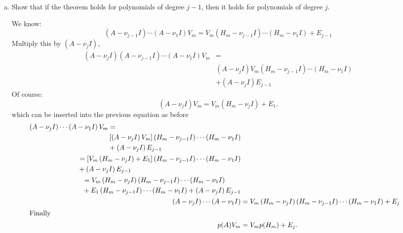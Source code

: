 \documentclass[10pt,letterpaper]{article}
\begin{document}
\begin{enumerate}[(a)]
    \item Show that if the theorem holds for polynomials of degree $j-1$, then it holds for polynomials of degree $j$.

        We know:
        \begin{equation}
            \left(A-\nu_{j-1}I\right)\cdots\left(A-\nu_1I\right)V_m = V_m\left(H_m-\nu_{j-1}I\right)\cdots\left(H_m-\nu_1I\right) + E_{j-1}
        \end{equation}
        Multiply this by $\left(A-\nu_jI\right)$,
        \begin{equation}\begin{split}
            \left(A-\nu_jI\right)\left(A-\nu_{j-1}I\right)\cdots\left(A-\nu_1I\right)V_m &= \\
            & \left(A-\nu_jI\right)V_m\left(H_m-\nu_{j-1}I\right)\cdots\left(H_m-\nu_1I\right) \\
            &+ \left(A-\nu_jI\right)E_{j-1}
        \end{split}\end{equation}
        Of course:
        \begin{equation}
            \left(A-\nu_jI\right)V_m = V_m\left(H_m-\nu_jI\right) + E_1.
        \end{equation}
        which can be inserted into the previous equation  as before
        \begin{subequations}\begin{align}
            \begin{split}
                \left(A-\nu_jI\right)\cdots\left(A-\nu_1I\right)V_m &= \\
                &\left[ \left(A-\nu_jI\right)V_m \right]\left(H_m-\nu_{j-1}I\right)\cdots\left(H_m-\nu_1I\right) \\
                &+ \left(A-\nu_jI\right)E_{j-1}
            \end{split} \\
            \begin{split}
                &= \left[ V_m\left(H_m-\nu_jI\right) + E_1 \right]\left(H_m-\nu_{j-1}I\right)\cdots\left(H_m-\nu_1I\right) \\
                &+ \left(A-\nu_jI\right)E_{j-1}
            \end{split} \\
            \begin{split}
                &= V_m\left(H_m-\nu_jI\right)\left(H_m-\nu_{j-1}I\right)\cdots\left(H_m-\nu_1I\right) \\
                &+ E_1\left(H_m-\nu_{j-1}I\right)\cdots\left(H_m-\nu_1I\right) + \left(A-\nu_jI\right)E_{j-1}
            \end{split} \\
               \left(A-\nu_jI\right)\cdots\left(A-\nu_1I\right) &= V_m\left(H_m-\nu_jI\right)\left(H_m-\nu_{j-1}I\right)\cdots\left(H_m-\nu_1I\right) + E_j \\
       \intertext{Finally}
       p(A)V_m &= V_mp(H_m) + E_j.
        \end{align}\end{subequations}
\end{enumerate}
\end{document}
